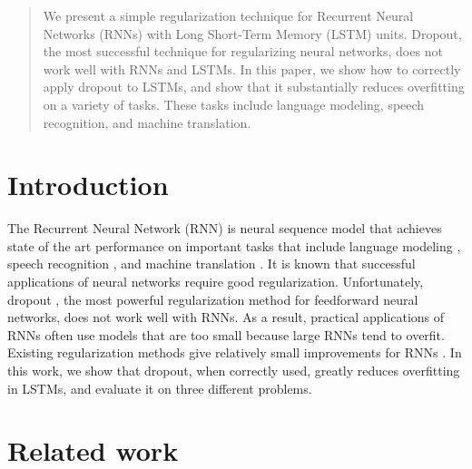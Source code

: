 \documentclass{article}
\begin{document}
 


\begin{abstract} 
  We present a simple regularization technique for Recurrent Neural
  Networks (RNNs) with Long Short-Term Memory (LSTM) units.  Dropout,
  the most successful technique for regularizing neural networks, does
  not work well with RNNs and LSTMs.  In this paper, we show how to
  correctly apply dropout to LSTMs, and show that it
  substantially reduces overfitting on a variety of tasks. These tasks
  include language modeling, speech recognition, and machine
  translation.
\end{abstract} 

\section{Introduction}

The Recurrent Neural Network (RNN) is neural sequence model that achieves state of the art
performance on important tasks that include language modeling
\cite{mikolov2012statistical}, speech recognition
\cite{graves2013speech}, and machine translation
\cite{kal13}.  It is known that successful applications of
neural networks require good regularization. Unfortunately, dropout
\cite{srivastava2013improving}, the most powerful regularization method
for feedforward neural networks, does not work well with
RNNs. As a result, practical applications of RNNs often
use models that are too small because large RNNs tend to overfit.  
Existing regularization methods give relatively small improvements for
RNNs \cite{graves2013generating}.
In this work, we show that dropout, when correctly used,
greatly reduces overfitting in LSTMs, and evaluate it on three different problems.

\section{Related work}
\end{document}
